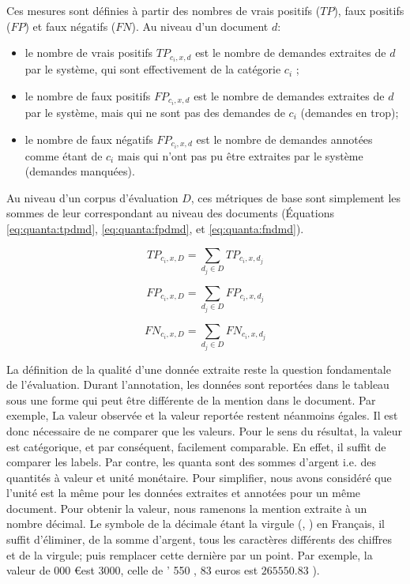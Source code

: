 Ces mesures sont définies à partir des nombres de vrais positifs ($TP$), faux positifs ($FP$) et faux négatifs ($FN$). Au niveau d'un document $d$:
\begin{itemize}
\item le nombre de vrais positifs $TP_{c_i, x, d}$ est le nombre de demandes extraites de $d$ par le système, qui sont effectivement de la catégorie $c_i$ ;
\item le nombre de faux positifs $FP_{c_i, x, d}$ est le nombre de demandes extraites de $d$ par le système, mais qui ne sont pas des demandes de $c_i$ (demandes en trop);
\item le nombre de faux négatifs $FP_{c_i, x, d}$ est le nombre de demandes annotées comme étant de $c_i$ mais qui n'ont pas pu être extraites par le système (demandes manquées).
\end{itemize}

Au niveau d'un corpus d'évaluation $D$, ces métriques de base sont simplement les sommes de leur correspondant au niveau des documents (Équations \ref{eq:quanta:tpdmd}, \ref{eq:quanta:fpdmd}, et \ref{eq:quanta:fndmd}).

\begin{equation}
TP_{c_i,x,D} = \sum\limits_{d_j \in D} TP_{c_i,x,d_j} \label{eq:quanta:tpdmd}
\end{equation}

\begin{equation}
FP_{c_i,x,D} = \sum\limits_{d_j \in D} FP_{c_i,x,d_j} \label{eq:quanta:fpdmd}
\end{equation}

\begin{equation}
FN_{c_i,x,D} = \sum\limits_{d_j \in D} FN_{c_i,x,d_j} \label{eq:quanta:fndmd}
\end{equation}


La définition de la qualité d'une donnée extraite reste la question fondamentale de l'évaluation. Durant l'annotation, les données sont reportées dans le tableau sous une forme qui peut être différente de la mention dans le document. Par exemple,  La valeur observée et la valeur reportée restent néanmoins égales. Il est donc nécessaire de ne comparer que les valeurs. Pour le sens du résultat, la valeur est catégorique, et par conséquent, facilement comparable. En effet, il suffit de comparer les labels. Par contre, les quanta sont des sommes d'argent i.e. des quantités à valeur et unité monétaire. Pour simplifier, nous avons considéré que l'unité est la même pour les données extraites et annotées pour un même document. Pour obtenir la valeur, nous ramenons la mention extraite à un nombre décimal. Le symbole de la décimale étant la virgule (\og , \fg) en Français, il suffit d'éliminer, de la somme d'argent, tous les caractères différents des chiffres et de la virgule; puis remplacer cette dernière par un point. Par exemple, la valeur de  000 \euro \fg est $3000$, celle de  ' 550 , 83 euros \fg est $265550.83$ ).



